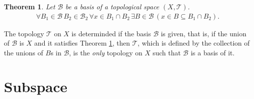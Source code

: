 \documentclass{article}%
\theoremstyle{plain}
\newtheorem{theorem}{Theorem}[section] %
\theoremstyle{definition}
\begin{document}
\begin{theorem}\label{intersection_basis}
Let $\mathscr B$ be a basis of a topological space $(X,\mathscr T)$.
\begin{align*}
	\forall B_1\in \mathscr B\,B_2\in\mathscr B_2\,
		\forall x\in B_1\cap B_2 \,
			\exists B\in \mathscr B\,(x\in B\subseteq B_1\cap B_2).
\end{align*}
\end{theorem}

The topology $\mathscr T$ on $X$ is determinded if the basis $\mathscr B$ is given,
that is, if the union of $\mathscr B$ is $X$ and it satisfies Theorem \ref{intersection_basis}, 
then $\mathscr T$, which is defined by the collection of the unions of $B$s in $\mathscr B$,
is the \emph{only} topology on $X$ such that $\mathscr B$ is a basis of it. 
\section{Subspace}
\printindex
\end{document}

